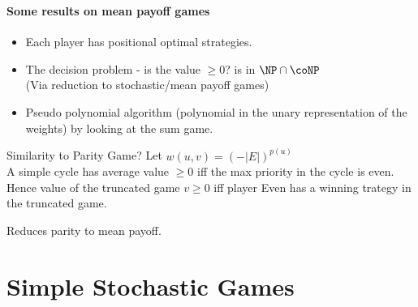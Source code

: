 \documentclass{beamer}
\newenvironment{slide}
{\begin{frame}[environment=slide]
\frametitle{\insertsection}}
{\end{frame}}
\begin{document}
  \begin{slide}
      \framesubtitle{Some results on mean payoff games}
      \begin{itemize}
        \item Each player has positional optimal strategies.
        \item The decision problem - \alert{is the value $\geq 0$?} is in $\NP \cap \coNP$ \\
            (Via reduction to stochastic/mean payoff games)
        \item Pseudo polynomial algorithm (polynomial in the unary representation of the weights) by looking at the sum game.
      \end{itemize}

      \begin{block}{Similarity to Parity Game?}
          Let $w(u,v) = (-|E|)^{p(u)}$\\
          A simple cycle has average value $\geq 0$ iff the max priority in the cycle is even.\\ \pause
          Hence value of the truncated game $v \geq 0$ iff player Even has a winning trategy in the truncated game.
      \end{block}

      Reduces parity to mean payoff.
  \end{slide}
  \section{Simple Stochastic Games}
\end{document}
